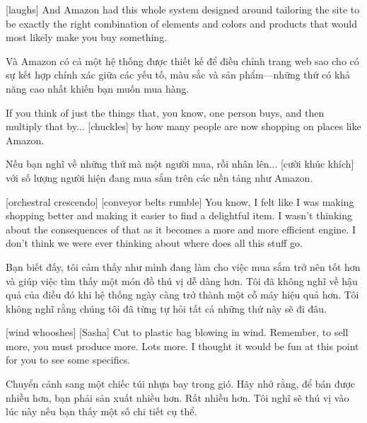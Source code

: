 \documentclass[a4paper]{article}
\begin{document}
	[laughs] And Amazon had this whole system designed around tailoring the site to be exactly the right combination of elements and colors and products that would most likely make you buy something.
	
	\begin{vietnamese-v2}
		[cười] Và Amazon có cả một hệ thống được thiết kế để điều chỉnh trang web sao cho có sự kết hợp chính xác giữa các yếu tố, màu sắc và sản phẩm—những thứ có khả năng cao nhất khiến bạn muốn mua hàng.
	\end{vietnamese-v2}
	
	
	If you think of just the things that, you know, one person buys, and then multiply that by... [chuckles] by how many people are now shopping on places like Amazon.
	
	\begin{vietnamese-v2}
		Nếu bạn nghĩ về những thứ mà một người mua, rồi nhân lên... [cười khúc khích] với số lượng người hiện đang mua sắm trên các nền tảng như Amazon.
	\end{vietnamese-v2}
	
	[orchestral crescendo]
	[conveyor belts rumble]
	You know, I felt like I was making shopping better and making it easier to find a delightful item.
	I wasn't thinking about the consequences of that as it becomes a more and more efficient engine.
	I don't think we were ever thinking about where does all this stuff go.
	
	\begin{vietnamese-v2}
		Bạn biết đấy, tôi cảm thấy như mình đang làm cho việc mua sắm trở nên tốt hơn và giúp việc tìm thấy một món đồ thú vị dễ dàng hơn. 
		Tôi đã không nghĩ về hậu quả của điều đó khi hệ thống ngày càng trở thành một cỗ máy hiệu quả hơn. 
		Tôi không nghĩ rằng chúng tôi đã từng tự hỏi tất cả những thứ này sẽ đi đâu.
	\end{vietnamese-v2}
	
	[wind whooshes]
	[Sasha] Cut to plastic bag blowing in wind.
	Remember, to sell more, you must produce more.
	Lots more.
	I thought it would be fun at this point for you to see some specifics.
	
	\begin{vietnamese-v2}
		 Chuyển cảnh sang một chiếc túi nhựa bay trong gió. 
		Hãy nhớ rằng, để bán được nhiều hơn, bạn phải sản xuất nhiều hơn. 
		Rất nhiều hơn. 
		Tôi nghĩ sẽ thú vị vào lúc này nếu bạn thấy một số chi tiết cụ thể.
	\end{vietnamese-v2}
	
\end{document}
